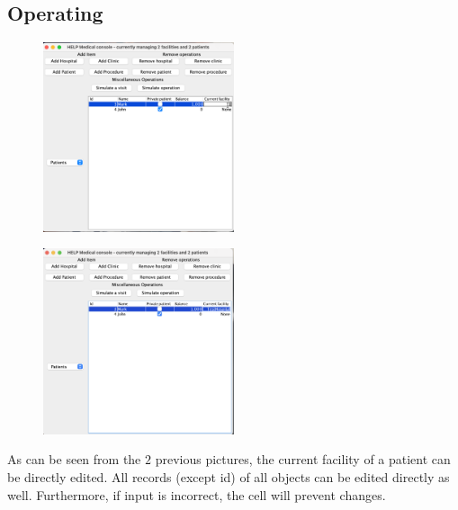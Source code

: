 \documentclass{article}
\begin{document}
\subsection{Operating}\label{sub:operating} %
\begin{figure}
  \begin{center}
    \includegraphics[width=0.5\textwidth]{./figures/Operation/Operation_1.png}
  \end{center}
\end{figure}

\begin{figure}
  \begin{center}
    \includegraphics[width=0.5\textwidth]{./figures/Operation/Operation_2.png}
  \end{center}
\end{figure}

As can be seen from the $2$ previous pictures, the current facility of a patient can be directly edited. All records (except id) of all objects can be edited directly as well. Furthermore, if input is incorrect, the cell will prevent changes.
\end{document}
